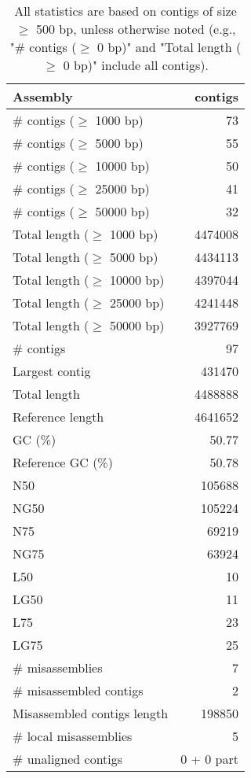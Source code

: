 \documentclass[12pt,a4paper]{article}
\begin{document}
\begin{table}[ht]
\begin{center}
\caption{All statistics are based on contigs of size $\geq$ 500 bp, unless otherwise noted (e.g., "\# contigs ($\geq$ 0 bp)" and "Total length ($\geq$ 0 bp)" include all contigs).}
\begin{tabular}{|l*{1}{|r}|}
\hline
Assembly & contigs \\ \hline
\# contigs ($\geq$ 1000 bp) & 73 \\ \hline
\# contigs ($\geq$ 5000 bp) & 55 \\ \hline
\# contigs ($\geq$ 10000 bp) & 50 \\ \hline
\# contigs ($\geq$ 25000 bp) & 41 \\ \hline
\# contigs ($\geq$ 50000 bp) & 32 \\ \hline
Total length ($\geq$ 1000 bp) & 4474008 \\ \hline
Total length ($\geq$ 5000 bp) & 4434113 \\ \hline
Total length ($\geq$ 10000 bp) & 4397044 \\ \hline
Total length ($\geq$ 25000 bp) & 4241448 \\ \hline
Total length ($\geq$ 50000 bp) & 3927769 \\ \hline
\# contigs & 97 \\ \hline
Largest contig & 431470 \\ \hline
Total length & 4488888 \\ \hline
Reference length & 4641652 \\ \hline
GC (\%) & 50.77 \\ \hline
Reference GC (\%) & 50.78 \\ \hline
N50 & 105688 \\ \hline
NG50 & 105224 \\ \hline
N75 & 69219 \\ \hline
NG75 & 63924 \\ \hline
L50 & 10 \\ \hline
LG50 & 11 \\ \hline
L75 & 23 \\ \hline
LG75 & 25 \\ \hline
\# misassemblies & 7 \\ \hline
\# misassembled contigs & 2 \\ \hline
Misassembled contigs length & 198850 \\ \hline
\# local misassemblies & 5 \\ \hline
\# unaligned contigs & 0 + 0 part \\ \hline

\end{tabular}
\end{center}
\end{table}
\end{document}
